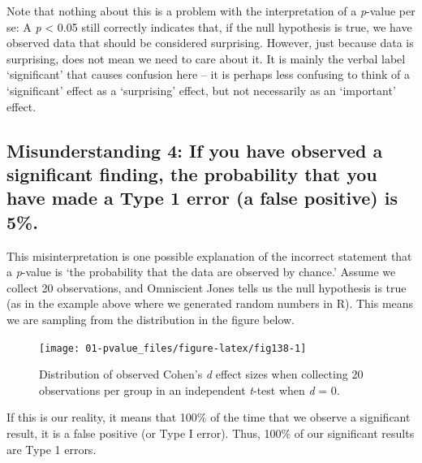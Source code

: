 \documentclass[
  oneside]{krantz}
\begin{document}
Note that nothing about this is a problem with the interpretation of a \emph{p}-value per se: A \emph{p} \textless{} 0.05 still correctly indicates that, if the null hypothesis is true, we have observed data that should be considered surprising. However, just because data is surprising, does not mean we need to care about it. It is mainly the verbal label `significant' that causes confusion here -- it is perhaps less confusing to think of a `significant' effect as a `surprising' effect, but not necessarily as an `important' effect.

\hypertarget{misconception4}{%
\subsection{Misunderstanding 4: If you have observed a significant finding, the probability that you have made a Type 1 error (a false positive) is 5\%.}\label{misconception4}}

This misinterpretation is one possible explanation of the incorrect statement that a \emph{p}-value is `the probability that the data are observed by chance.' Assume we collect 20 observations, and Omniscient Jones tells us the null hypothesis is true (as in the example above where we generated random numbers in R). This means we are sampling from the distribution in the figure below.



\begin{figure}

{\centering \texttt{[image: 01-pvalue\_files/figure-latex/fig138-1]} 

}

\caption{Distribution of observed Cohen's \emph{d} effect sizes when collecting 20 observations per group in an independent \emph{t}-test when \emph{d} = 0.}\label{fig:fig138}
\end{figure}

If this is our reality, it means that 100\% of the time that we observe a significant result, it is a false positive (or Type I error). Thus, 100\% of our significant results are Type 1 errors.
\end{document}

